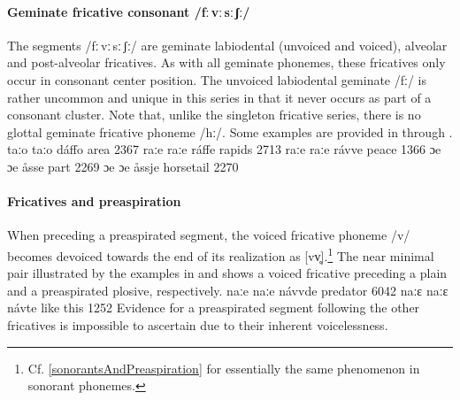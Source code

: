 \paragraph{Geminate fricative consonant /fː\,vː\,sː\,ʃː/}
The segments /fː\,vː\,sː\,ʃː/ are geminate labiodental (unvoiced and voiced), alveolar and post-alveolar fricatives. As with all geminate phonemes, these fricatives only occur in consonant center position. The unvoiced labiodental geminate /fː/ is rather uncommon and unique in this series in that it never occurs as part of a consonant cluster. Note that, unlike the singleton fricative series, there is no glottal geminate fricative phoneme /hː/. Some examples are provided in  through .
	{taːo}	{taːo}	{dáffo}	{area\BS{}}		{2367}%
	{raːe}	{raːe}	{ráffe}	{rapids\BS{}}		{2713}%
	{raːe}	{raːe}	{rávve}	{peace\BS{}}		{1366}%
	{ɔe}	{ɔe}	{åsse}	{part\BS{}}	{2269}
	{ɔe}	{ɔe}	{åssje}	{horsetail\BS{}}	{2270}


\paragraph{Fricatives and preaspiration}\label{fricativesAndPreaspiration}
When preceding a preaspirated segment, the voiced fricative phoneme /v/ becomes devoiced towards the end of its realization as [vv̥].\footnote{Cf. \SEC\ref{sonorantsAndPreaspiration} for essentially the same phenomenon in sonorant phonemes.} 
The near minimal pair illustrated by the examples in  and  shows a voiced fricative preceding a plain and a preaspirated plosive, respectively.
	{naːe}	{naːe}	{návvde}	{predator\BS{}}		{6042}%
		{naːɛ}	{naːɛ}	{návte}	{like this}		{1252}%
Evidence for a preaspirated segment following the other fricatives is impossible to ascertain due to their inherent voicelessness.


